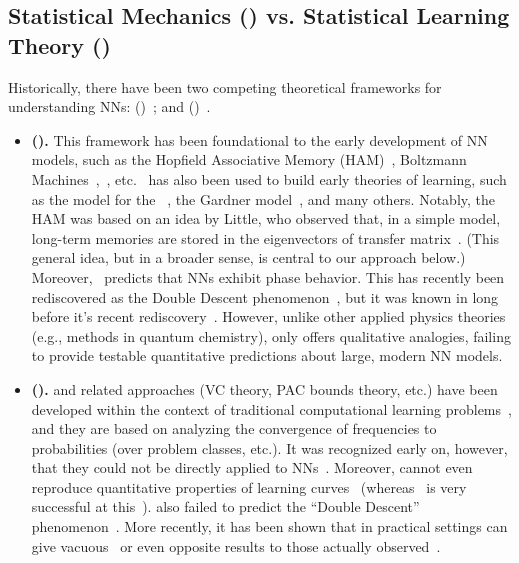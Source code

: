 \subsection{Statistical Mechanics (\STATMECH) vs. Statistical Learning Theory (\SLT)}

Historically, there have been two competing theoretical frameworks for understanding NNs:
\emph{\StatisticalMechanics} (\STATMECH)~\cite{Eng01, EB01_BOOK, Gardner_1988,SST90, SST92, LTS90, Solla2023}; and 
\emph{\StatisticalLearningTheory} (\SLT)~\cite{Vapnik98}. 
\begin{itemize}
\item
\textbf{\StatisticalMechanics (\STATMECH).}
This framework has been foundational to the early development of NN models, such as the Hopfield Associative Memory (HAM)~\cite{Hop82}, Boltzmann Machines~\cite{AHS85},~\cite{HinSej86_relearn}, etc.
\STATMECH~has also been used to build early theories of learning, such as the \StudentTeacher model for the \Perceptron \GeneralizationError~\cite{Eng01,EB01_BOOK}, the Gardner model~\cite{Gardner_1988}, and many others.
Notably, the HAM was based on an idea by Little, who observed that, in a simple model, long-term memories are stored in the eigenvectors of transfer matrix~\cite{Lit74}.
(This general idea, but in a broader sense, is central to our approach below.)
Moreover, \STATMECH~predicts that NNs exhibit phase behavior.
This has recently been rediscovered as the Double Descent phenomenon~\cite{BHMM19,loog2020}, but it was known in \STATMECH long before it's recent rediscovery~\cite{Opper01}.
However, unlike other applied physics theories (e.g., \SemiEmpirical methods in quantum chemistry), \STATMECH only offers qualitative analogies, failing to provide testable quantitative predictions
about large, modern NN models.\cite{roberts2022principles}
\item
\textbf{\StatisticalLearningTheory (\SLT).}
\SLT and related approaches (VC theory, PAC bounds theory, etc.) have been developed within the context of traditional computational learning problems~\cite{Vapnik98}, and 
they are based on analyzing the convergence of frequencies to probabilities (over problem classes, etc.).
It was recognized early on, however, that they could not be directly applied to NNs~\cite{VLL94}.
Moreover, \SLT cannot even reproduce quantitative properties of learning curves~\cite{WRB93,DKST96} (whereas \STATMECH~is very successful at this~\cite{SST92}).
\SLT also failed to predict the ``Double Descent'' phenomenon~\cite{BHMM19}.
More recently, it has been shown that in practical settings
\SLT can give vacuous~\cite{DR17_nonvacuous_TR} or even opposite results
to those actually observed~\cite{MM21a_simpsons_TR}.
\end{itemize}

